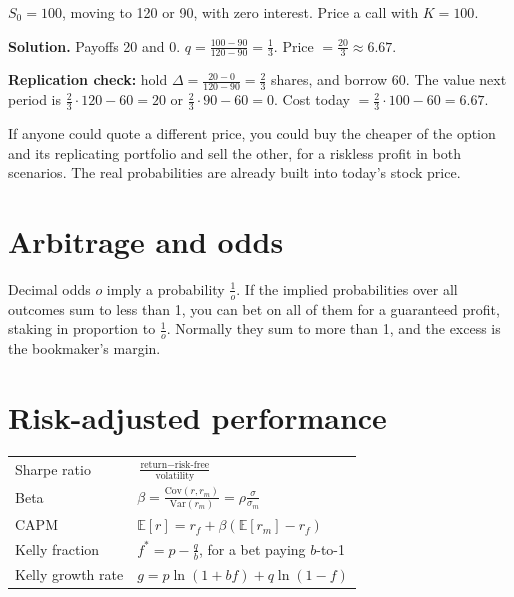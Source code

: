 \documentclass[11pt,a4paper,openany]{report}
\newcommand{\E}{\mathbb{E}}
\begin{document}
\begin{example}
$S_0=100$, moving to 120 or 90, with zero interest. Price a call with $K=100$.

\textbf{Solution.} Payoffs 20 and 0. $q=\frac{100-90}{120-90}=\frac13$. Price $=\frac{20}3\approx\mathbf{6.67}$.

\textbf{Replication check:} hold $\Delta=\frac{20-0}{120-90}=\frac23$ shares, and borrow 60. The value next period is $\frac23\cdot120-60=20$ or $\frac23\cdot90-60=0$. Cost today $=\frac23\cdot100-60=6.67$. \checkmark
\end{example}

\begin{why}
If anyone could quote a different price, you could buy the cheaper of the option and its replicating portfolio and sell the other, for a riskless profit in both scenarios. The real probabilities are already built into today's stock price.
\end{why}

\section{Arbitrage and odds}
Decimal odds $o$ imply a probability $\frac1o$. If the implied probabilities over all outcomes sum to less than 1, you can bet on all of them for a guaranteed profit, staking in proportion to $\frac1o$. Normally they sum to more than 1, and the excess is the bookmaker's margin.

\section{Risk-adjusted performance}
\begin{center}\small
\begin{tabular}{ll}
\toprule
Sharpe ratio & $\frac{\text{return}-\text{risk-free}}{\text{volatility}}$\\
Beta & $\beta=\frac{\text{Cov}(r,r_m)}{\text{Var}(r_m)}=\rho\frac{\sigma}{\sigma_m}$\\
CAPM & $\E[r]=r_f+\beta(\E[r_m]-r_f)$\\
Kelly fraction & $f^*=p-\frac qb$, for a bet paying $b$-to-1\\
Kelly growth rate & $g=p\ln(1+bf)+q\ln(1-f)$\\
\bottomrule
\end{tabular}
\end{center}
\end{document}
